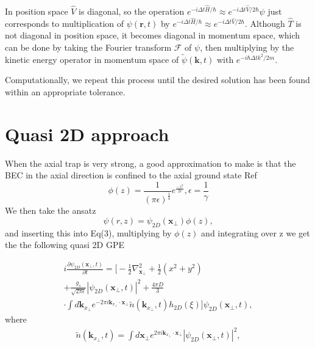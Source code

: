 \documentclass[10pt]{article}
\numberwithin{equation}{section}
\begin{document}
\begin{multicols}{2}
In position space $\hat{V}$ is diagonal, so the operation $e^{-i \Delta t \hat{H} /\hbar} \approx e^{-i \Delta t \hat{V} /2\hbar} \psi$ just corresponds to multiplication of $\psi(\textbf{r},t)$ by $e^{-i \Delta t \hat{H} /\hbar} \approx e^{-i \Delta t \hat{V} /2\hbar}$. Although $\hat{T}$ is not diagonal in position space, it becomes diagonal in momentum space, which can be done by taking the Fourier transform $\mathcal{F}$ of $\psi$, then multiplying by the kinetic energy operator in momentum space of $\tilde{\psi}(\textbf{k},t)$ with $e^{-i \hbar \Delta t k^2 /2m}$.

Computationally, we repeat this process until the desired solution has been found within an appropriate tolerance.

\section{Quasi 2D approach}
When the axial trap is very strong, a good approximation to make is that the BEC in the axial direction is confined to the axial ground state Ref\cite{KUMAR2015117}
 \begin{equation}
\phi(z) = \frac{1}{(\pi\epsilon)^{\frac{1}{4}}}e^{\frac{-z^{2}}{2\epsilon}}, \epsilon = \frac{1}{\gamma}
\end{equation}
We then take the ansatz 
 \begin{equation}
\psi(r,z) = \psi_{2D}(\textbf{x}_{\perp})\phi(z),
\end{equation}
and inserting this into Eq(3), multiplying by $\phi(z)$ and integrating over z we get the the following quasi 2D GPE




\begin{multline}
i\frac{\partial \psi_{2D}(\textbf{x}_{\perp},t)}{\partial t}=\bigg[-\frac{1}{2}\nabla_{\textbf{x}_{\perp}}^2 + \frac{1}{2}(x^2+y^2) \\+\frac{g_{s}}{\sqrt{2\pi\epsilon}}|\psi_{2D}(\textbf{x}_{\perp},t)|^2
+\frac{4\pi D}{3}\\\cdot\int d\textbf{k}_{x_{\perp}}e^{-2\pi i\textbf{k}_{x_{\perp}}\cdotp \textbf{x}_{\perp}}\tilde{n}(\textbf{k}_{x_{\perp}},t)h_{2D}(\xi)\bigg]\psi_{2D}(\textbf{x}_{\perp},t),
\end{multline}
where 
\begin{multline}
\tilde{n}(\textbf{k}_{x_{\perp}},t) = \int d\textbf{x}_{\perp}e^{2\pi i\textbf{k}_{x_{\perp}}\cdotp \textbf{x}_{\perp}}|\psi_{2D}(\textbf{x}_{\perp},t)|^2,
\end{multline}


\end{multicols}
\end{document}
